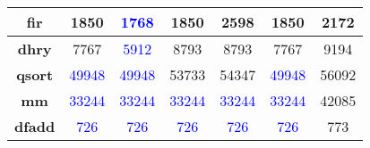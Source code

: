 \begin{table*}[!t]
\begin{tabular}{|c|c|c|c|c|c|c|}
\textbf{fir}        & 1850                                & \textcolor{blue}{1768}  & 1850                                & 2598                                 & 1850                              & 2172    \\ \hline
\textbf{dhry}       & 7767                                & \textcolor{blue}{5912}  & 8793                                & 8793                                 & 7767                              & 9194    \\ \hline
\textbf{qsort}      & \textcolor{blue}{49948}  & \textcolor{blue}{49948} & 53733                               & 54347                                & \textcolor{blue}{49948}                              & 56092   \\ \hline
\textbf{mm}         & \textcolor{blue}{33244}  & \textcolor{blue}{33244} & \textcolor{blue}{33244}  & \textcolor{blue}{33244}   & \textcolor{blue}{33244}                              & 42085   \\ \hline
\textbf{dfadd}      & \textcolor{blue}{726}    & \textcolor{blue}{726}   & \textcolor{blue}{726}    & \textcolor{blue}{726}     & \textcolor{blue}{726}                              & 773     \\ \hline
\end{tabular}
\end{table*}

